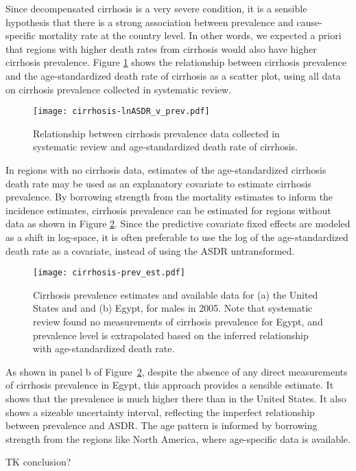 Since decompensated cirrhosis is a very severe condition, it is a
sensible hypothesis that there is a strong association between
prevalence and cause-specific mortality rate at the country level.  In
other words, we expected a priori that regions with higher death rates
from cirrhosis would also have higher cirrhosis prevalence.  Figure
\ref{fig:app-cirrhosis asp} shows the relationship between cirrhosis
prevalence and the age-standardized death rate of cirrhosis as a
scatter plot, using all data on cirrhosis prevalence collected in
systematic review.

    \begin{figure}[h]
        \begin{center}
            \texttt{[image: cirrhosis-lnASDR\_v\_prev.pdf]}
            \caption{Relationship between cirrhosis prevalence data
              collected in systematic review and age-standardized
              death rate of cirrhosis.}
            \label{fig:app-cirrhosis asp}
        \end{center}
    \end{figure}

In regions with no cirrhosis data, estimates of the age-standardized
cirrhosis death rate may be used as an explanatory covariate to
estimate cirrhosis prevalence.  By borrowing strength from the
mortality estimates to inform the incidence estimates, cirrhosis
prevalence can be estimated for regions without data as shown in
Figure \ref{fig:app-cirrhosis prev est}.  Since the predictive
covariate fixed effects are modeled as a shift in log-space, it is
often preferable to use the log of the age-standardized death rate as
a covariate, instead of using the ASDR untransformed.

    \begin{figure}[h]
        \begin{center}
            \texttt{[image: cirrhosis-prev\_est.pdf]}
            \caption{Cirrhosis prevalence estimates and available data
              for (a) the United States and and (b) Egypt, for males
              in 2005. Note that systematic review found no
              measurements of cirrhosis prevalence for Egypt, and
              prevalence level is extrapolated based on the inferred
              relationship with age-standardized death rate.}
            \label{fig:app-cirrhosis prev est}
        \end{center}
    \end{figure}

As shown in panel b of Figure~\ref{fig:app-cirrhosis prev est},
despite the absence of any direct measurements of cirrhosis prevalence
in Egypt, this approach provides a sensible estimate.  It shows that
the prevalence is much higher there than in the United States.  It
also shows a sizeable uncertainty interval, reflecting the imperfect
relationship between prevalence and ASDR.  The age pattern is informed
by borrowing strength from the regions like North America, where
age-specific data is available.

TK conclusion?

